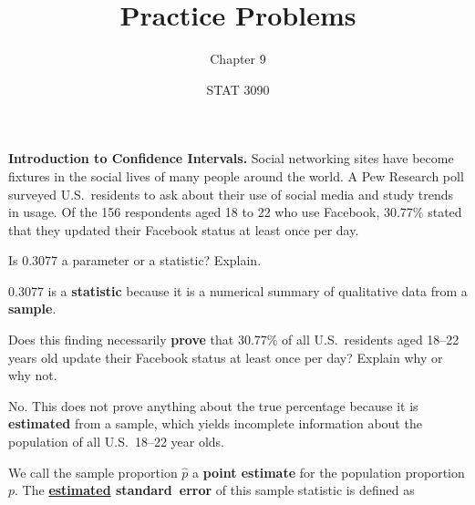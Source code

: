 \documentclass[noanswers]{exam}
\title{Practice Problems}
\author{Chapter 9}
\date{STAT 3090}
\begin{document}
%

\noindent \textbf{Introduction to Confidence Intervals. }Social networking sites have become fixtures in the social lives of many people around the world. A Pew Research poll surveyed U.S.\ residents to ask about their use of social media and study trends in usage. Of the 156 respondents aged 18 to 22 who use Facebook, 30.77\% stated that they updated their Facebook status at least once per day.

\vspace{3mm}

\begin{questions}
		
	\question Is 0.3077 a parameter or a statistic? Explain.
		
	\begin{solution}[\stretch{1}]
	
	\vspace{1mm}

	0.3077 is a \textbf{statistic} because it is a numerical summary of qualitative data from a \textbf{sample}.
	
	\vspace{1mm}

	\end{solution}	
	
	\question Does this finding necessarily \textbf{prove} that 30.77\% of all U.S.\ residents aged 18--22 years old update their Facebook status at least once per day? Explain why or why not.
	
	\begin{solution}[\stretch{1}]
	
	\vspace{1mm}

	No. This does not prove anything about the true percentage because it is \textbf{estimated} from a sample, which yields incomplete information about the population of all U.S.\ 18--22 year olds.
	
	\vspace{1mm}

	\end{solution}	
		
	\question We call the sample proportion $\hat{p}$ a \textbf{point estimate} for the population proportion $p$. The \textbf{\underline{estimated} \mbox{standard error}} of this sample statistic is defined as 


\end{questions}
\end{document}
